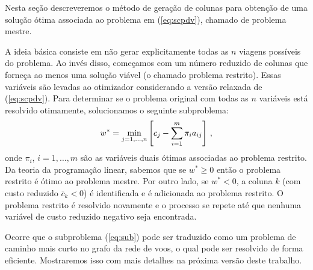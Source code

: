 Nesta seção descreveremos o método de geração de colunas para obtenção de uma solução ótima 
associada ao problema em (\ref{eq:scpdv}), chamado de problema mestre.

A ideia básica consiste em não gerar explicitamente todas as $n$ viagens possíveis do problema. 
Ao invés disso, começamos com um número reduzido de colunas que forneça ao menos uma solução viável
(o chamado problema restrito). Essas variáveis são levadas ao otimizador considerando a versão 
relaxada de (\ref{eq:scpdv}). Para determinar se o problema original com todas as $n$ variáveis 
está resolvido otimamente, solucionamos o seguinte subproblema:
%
\begin{equation} \label{eq:sub}
	w^\ast = \min_{j = 1, \ldots, n} \left[ c_j - \sum_{i=1}^m \pi_i a_{ij} \right] \, ,
\end{equation} 
%
onde $\pi_i$, $i = 1, \ldots, m$ são as variáveis duais ótimas associadas ao problema restrito.
Da teoria da programação linear, sabemos que se $w^\ast \geq 0$ então o problema restrito é ótimo
ao problema mestre. Por outro lado, se  $w^\ast < 0$, a coluna $k$ (com custo reduzido 
$\bar{c}_k < 0$) é identificada e é adicionada ao problema restrito. O problema restrito é 
resolvido novamente e o processo se repete até que nenhuma variável de custo reduzido negativo 
seja encontrada.

Ocorre que o subproblema (\ref{eq:sub}) pode ser traduzido como um problema de caminho mais curto 
no grafo da rede de voos, o qual pode ser resolvido de forma eficiente. Mostraremos isso com mais 
detalhes na próxima versão deste trabalho.

